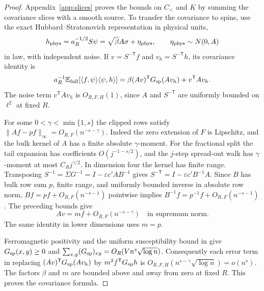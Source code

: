 \documentclass[11pt]{article}
\numberwithin{equation}{section}
\newcommand{\E}{\mathbb E}
\newcommand{\ip}[2]{\langle #1,#2\rangle}
\begin{document}
\begin{proof}
Appendix~\ref{app:slices} proves the bounds on $C_<$ and $K$ by
summing the covariance slices with a smooth source. To transfer the
covariance to spins, use the exact Hubbard--Stratonovich representation
in physical units,
\begin{equation}
 h_{\rm phys}=a_R^{-1/2}S\psi
 =\sqrt\beta A\sigma+\eta_{\rm phys},\qquad
 \eta_{\rm phys}\sim N(0,A)
\end{equation}
in law, with independent noise. If \(v=S^{-\mathsf T}f\) and
\(v_h=S^{-\mathsf T}h\), its covariance identity is
\begin{equation}
 a_R^{-1}\E_{\rm full}[\ip{f}{\psi}\ip{\psi}{h}]
   =\beta(Av)^{\mathsf T}G_{\rm sp}(Av_h)+v^{\mathsf T}Av_h.
\end{equation}
The noise term \(v^{\mathsf T}Av_h\) is \(O_{R,F,H}(1)\), since \(A\) and
\(S^{-\mathsf T}\) are uniformly bounded on \(\ell^2\) at fixed \(R\).

For some \(0<\gamma<\min\{1,s\}\) the clipped rows satisfy
\(\|Af-pf\|_\infty=O_{R,F}(n^{-s-\gamma})\).
Indeed the zero extension of \(F\) is Lipschitz, and the bulk
kernel of \(A\) has a finite absolute \(\gamma\)-moment. For
the fractional split the tail expansion has coefficients
\(O(j^{-1-s/2})\), and the \(j\)-step spread-out walk
has \(\gamma\)-moment at most \(C_R j^{\gamma/2}\). In dimension
four the kernel has finite range. Transposing
$S^{-1}=\Sigma G^{-1}=I-\varepsilon c'AB^{-1}$ gives
\(S^{-\mathsf T}=I-\varepsilon c' B^{-1}A\). Since \(B\) has bulk
row sum \(p\), finite range, and uniformly bounded inverse in
absolute row norm, \(Bf=pf+O_{R,F}(n^{-s-1})\) pointwise implies
\(B^{-1}f=p^{-1}f+O_{R,F}(n^{-s-1})\). The preceding bounds give
\begin{equation}
 Av=m f+O_{R,F}(n^{-s-\gamma})\quad\text{in supremum norm}.
\end{equation}
The same identity in lower dimensions uses \(m=p\).

Ferromagnetic positivity and the uniform susceptibility bound in
\cite[Lemma~7.5 and Theorem~1.1]{base} give \(G_{\rm sp}(x,y)\ge0\)
and
\(\sum_{x,y}(G_{\rm sp})_{xy}=O_R(V n^s\sqrt{\log n})\).
Consequently each error term in replacing \((Av)^{\mathsf T}G_{\rm sp}(Av_h)\)
by \(m^2 f^{\mathsf T}G_{\rm sp}h\) is
\(O_{R,F,H}(n^{s-\gamma}\sqrt{\log n})=o(n^s)\).
The factors \(\beta\) and \(m\) are bounded above and away from
zero at fixed \(R\). This proves the covariance formula.


\end{proof}
\end{document}
